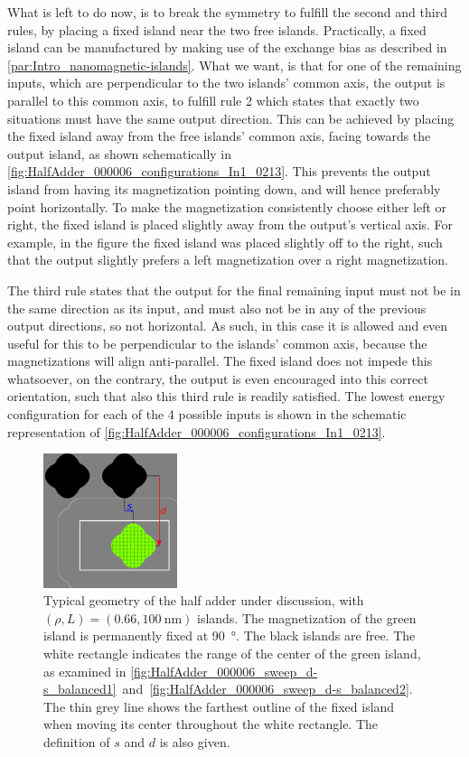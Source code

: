 \documentclass[11pt,a4paper,english,twoside]{article}
\begin{document}
What is left to do now, is to break the symmetry to fulfill the second and third rules, by placing a fixed island near the two free islands. Practically, a fixed island can be manufactured by making use of the exchange bias as described in \cref{par:Intro_nanomagnetic-islands}. What we want, is that for one of the remaining inputs, which are perpendicular to the two islands' common axis, the output is parallel to this common axis, to fulfill rule 2 which states that exactly two situations must have the same output direction. This can be achieved by placing the fixed island away from the free islands' common axis, facing towards the output island, as shown schematically in \cref{fig:HalfAdder_000006_configurations_In1_0213}. This prevents the output island from having its magnetization pointing down, and will hence preferably point horizontally. To make the magnetization consistently choose either left or right, the fixed island is placed slightly away from the output's vertical axis. For example, in the figure the fixed island was placed slightly off to the right, such that the output slightly prefers a left magnetization over a right magnetization. \par
The third rule states that the output for the final remaining input must not be in the same direction as its input, and must also not be in any of the previous output directions, so not horizontal. As such, in this case it is allowed and even useful for this to be perpendicular to the islands' common axis, because the magnetizations will align anti-parallel. The fixed island does not impede this whatsoever, on the contrary, the output is even encouraged into this correct orientation, such that also this third rule is readily satisfied. The lowest energy configuration for each of the 4 possible inputs is shown in the schematic representation of \cref{fig:HalfAdder_000006_configurations_In1_0213}.

\begin{figure}[t!]
    \centering
    \includegraphics[width=0.35\textwidth]{Figures/half_adder/regions000006.pdf}
    \caption{Typical geometry of the half adder under discussion, with $(\rho, L) = (0.66, \SI{100}{\nano\metre})$ islands. The magnetization of the green island is permanently fixed at \SI{90}{\degree}. The black islands are free. The white rectangle indicates the range of the center of the green island, as examined in \cref{fig:HalfAdder_000006_sweep_d-s_balanced1}~and~\ref{fig:HalfAdder_000006_sweep_d-s_balanced2}. The thin grey line shows the farthest outline of the fixed island when moving its center throughout the white rectangle. The definition of $s$ and $d$ is also given.}
    \label{fig:HalfAdder_000006_geometryTypical}
\end{figure}
\end{document}
